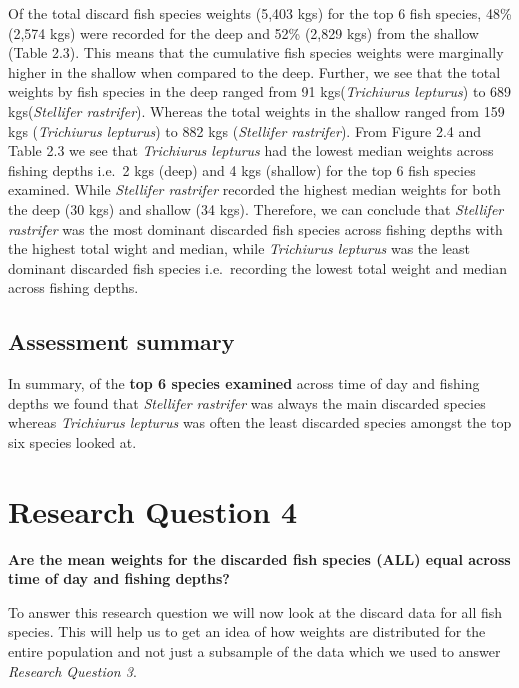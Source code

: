 \documentclass[
]{book}
\begin{document}
Of the total discard fish species weights (5,403 kgs) for the top 6 fish species, 48\% (2,574 kgs) were recorded for the deep and 52\% (2,829 kgs) from the shallow (Table 2.3). This means that the cumulative fish species weights were marginally higher in the shallow when compared to the deep. Further, we see that the total weights by fish species in the deep ranged from 91 kgs(\emph{Trichiurus lepturus}) to 689 kgs(\emph{Stellifer rastrifer}). Whereas the total weights in the shallow ranged from 159 kgs (\emph{Trichiurus lepturus}) to 882 kgs (\emph{Stellifer rastrifer}). From Figure 2.4 and Table 2.3 we see that \emph{Trichiurus lepturus} had the lowest median weights across fishing depths i.e.~2 kgs (deep) and 4 kgs (shallow) for the top 6 fish species examined. While \emph{Stellifer rastrifer} recorded the highest median weights for both the deep (30 kgs) and shallow (34 kgs). Therefore, we can conclude that \emph{Stellifer rastrifer} was the most dominant discarded fish species across fishing depths with the highest total wight and median, while \emph{Trichiurus lepturus} was the least dominant discarded fish species i.e.~recording the lowest total weight and median across fishing depths.

\hypertarget{assessment-summary-2}{%
\subsection{Assessment summary}\label{assessment-summary-2}}

In summary, of the \textbf{top 6 species examined} across time of day and fishing depths we found that \emph{Stellifer rastrifer} was always the main discarded species whereas \emph{Trichiurus lepturus} was often the least discarded species amongst the top six species looked at.

\hypertarget{research-question-4}{%
\section{Research Question 4}\label{research-question-4}}

\textbf{Are the mean weights for the discarded fish species (ALL) equal across time of day and fishing depths?}

To answer this research question we will now look at the discard data for all fish species. This will help us to get an idea of how weights are distributed for the entire population and not just a subsample of the data which we used to answer \emph{Research Question 3}.
\end{document}
